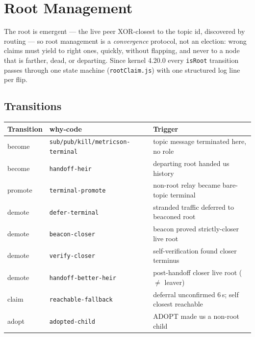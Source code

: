 \documentclass[nobib]{tufte-handout}
\begin{document}
\section{Root Management}\label{sec:roots}

The root is emergent --- the live peer XOR-closest to the topic id,
discovered by routing --- so root management is a \emph{convergence}
protocol, not an election: wrong claims must yield to right ones,
quickly, without flapping, and never to a node that is farther, dead, or
departing. Since kernel 4.20.0 every \texttt{isRoot} transition passes
through one state machine (\texttt{rootClaim.js}) with one structured
log line per flip.

\subsection{Transitions}

\begin{table}[h]
\scriptsize
\begin{tabular}{@{}lll@{}}
\toprule
Transition & why-code & Trigger \\
\midrule
become & \texttt{sub/pub/kill/metricson-terminal} & topic message terminated here, no role \\
become & \texttt{handoff-heir} & departing root handed us history \\
promote & \texttt{terminal-promote} & non-root relay became bare-topic terminal \\
demote & \texttt{defer-terminal} & stranded traffic deferred to beaconed root \\
demote & \texttt{beacon-closer} & beacon proved strictly-closer live root \\
demote & \texttt{verify-closer} & self-verification found closer terminus \\
demote & \texttt{handoff-better-heir} & post-handoff closer live root ($\ne$ leaver) \\
claim & \texttt{reachable-fallback} & deferral unconfirmed 6\,s; self closest reachable \\
adopt & \texttt{adopted-child} & ADOPT made us a non-root child \\
\bottomrule
\end{tabular}
\end{table}
\end{document}
